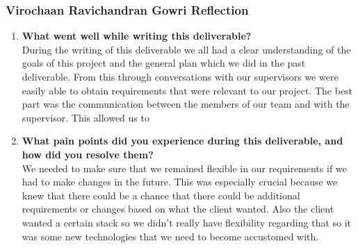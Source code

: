 \subsubsection*{Virochaan Ravichandran Gowri Reflection}
\begin{enumerate}
  \item \textbf{What went well while writing this deliverable?} \\
  During the writing of this deliverable we all had a clear understanding of the goals of this project and the general
  plan which we did in the past deliverable. From this through conversations with our supervisors we were easily able to
  obtain requirements that were relevant to our project. The best part was the communication between the members of our
  team and with the supervisor. This allowed us to
  \item \textbf{What pain points did you experience during this deliverable, and how did you resolve them?} \\
  We needed to make sure that we remained flexible in our requirements if we had to make changes in the future. This was
  especially crucial because we knew that there could be a chance that there could be additional requirements or changes
  based on what the client wanted. Also the client wanted a certain stack so we didn't really have flexibility regarding
  that so it was some new technologies that we need to become accustomed with.

\end{enumerate}

